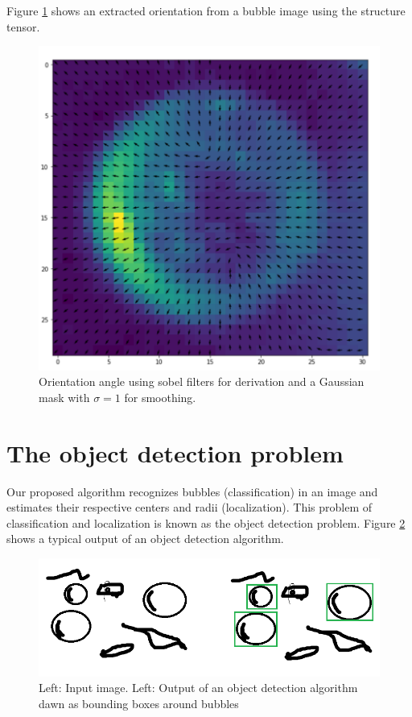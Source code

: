 		Figure \ref{fig:struct_tensor_demo} shows an extracted orientation from a bubble image using the structure tensor.
		\begin{figure}
			\centering
			\includegraphics[scale=0.4]{images/structure_tensor_demo.png}
			\caption{Orientation angle using sobel filters for derivation and a Gaussian mask with $\sigma =1$ for smoothing.}
			\label{fig:struct_tensor_demo}
		\end{figure}
		
	
	\section{The object detection problem}\label{the_object_detection_problem}
	
	Our proposed algorithm recognizes bubbles (classification) in an image and estimates their respective centers and radii (localization). This problem of classification and localization is known as the object detection problem. Figure \ref{fig:obj_detec_intro} shows a typical output of an object detection algorithm. 
	
	\begin{figure}
		\centering
		\includegraphics[scale=1]{images/object_detection_intro.png}
		\caption{Left: Input image. Left: Output of an object detection algorithm dawn as bounding boxes around bubbles}
		\label{fig:obj_detec_intro}
	\end{figure}
	
